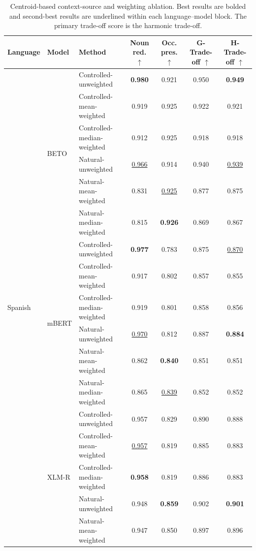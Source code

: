 \begin{table}[t]
\centering
\small
\caption{Centroid-based context-source and weighting ablation. Best results are bolded and second-best results are underlined within each language--model block. The primary trade-off score is the harmonic trade-off.}
\label{tab:centroid_context_ablation}
\begin{tabular}{lllcccc}
\toprule
Language & Model & Method & Noun red. $\uparrow$ & Occ. pres. $\uparrow$ & G-Trade-off $\uparrow$ & H-Trade-off $\uparrow$ \\
\midrule
\multirow{18}{*}{Spanish} & \multirow{6}{*}{BETO} & Controlled-unweighted & \textbf{0.980} & 0.921 & 0.950 & \textbf{0.949} \\
 &  & Controlled-mean-weighted & 0.919 & 0.925 & 0.922 & 0.921 \\
 &  & Controlled-median-weighted & 0.912 & 0.925 & 0.918 & 0.918 \\
 &  & Natural-unweighted & \underline{0.966} & 0.914 & 0.940 & \underline{0.939} \\
 &  & Natural-mean-weighted & 0.831 & \underline{0.925} & 0.877 & 0.875 \\
 &  & Natural-median-weighted & 0.815 & \textbf{0.926} & 0.869 & 0.867 \\
\cmidrule(lr){2-7}
 & \multirow{6}{*}{mBERT} & Controlled-unweighted & \textbf{0.977} & 0.783 & 0.875 & \underline{0.870} \\
 &  & Controlled-mean-weighted & 0.917 & 0.802 & 0.857 & 0.855 \\
 &  & Controlled-median-weighted & 0.919 & 0.801 & 0.858 & 0.856 \\
 &  & Natural-unweighted & \underline{0.970} & 0.812 & 0.887 & \textbf{0.884} \\
 &  & Natural-mean-weighted & 0.862 & \textbf{0.840} & 0.851 & 0.851 \\
 &  & Natural-median-weighted & 0.865 & \underline{0.839} & 0.852 & 0.852 \\
\cmidrule(lr){2-7}
 & \multirow{6}{*}{XLM-R} & Controlled-unweighted & 0.957 & 0.829 & 0.890 & 0.888 \\
 &  & Controlled-mean-weighted & \underline{0.957} & 0.819 & 0.885 & 0.883 \\
 &  & Controlled-median-weighted & \textbf{0.958} & 0.819 & 0.886 & 0.883 \\
 &  & Natural-unweighted & 0.948 & \textbf{0.859} & 0.902 & \textbf{0.901} \\
 &  & Natural-mean-weighted & 0.947 & 0.850 & 0.897 & 0.896 \\

\end{tabular}
\end{table}
